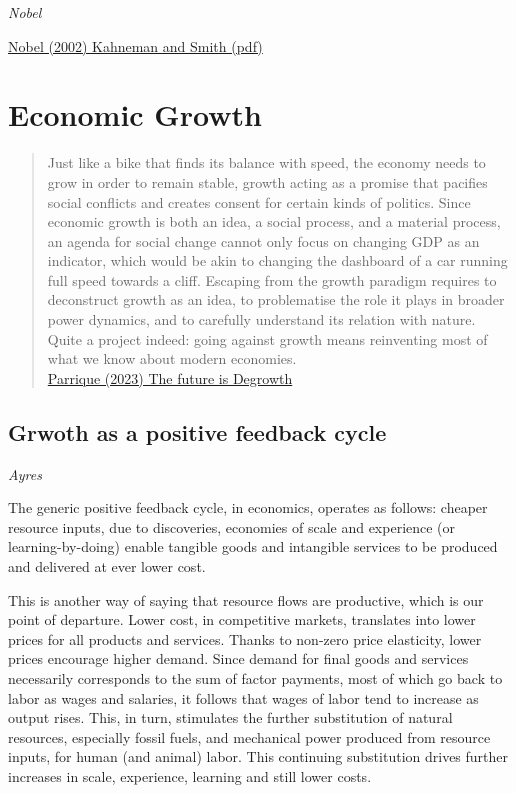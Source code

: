 \documentclass[
]{book}
\begin{document}
\emph{Nobel}

\href{pdf/Nobel_2002_Kahneman_and_Smith.pdf}{Nobel (2002) Kahneman and Smith (pdf)}

\hypertarget{economic-growth}{%
\chapter{Economic Growth}\label{economic-growth}}

\begin{quote}
Just like a bike that finds its balance with speed, the economy needs to grow in order to remain stable, growth acting as a promise that pacifies social conflicts and creates consent for certain kinds of politics.
Since economic growth is both an idea, a social process, and a material process, an agenda for social change cannot only focus on changing GDP as an indicator, which would be akin to changing the dashboard of a car running full speed towards a cliff. Escaping from the growth paradigm requires to deconstruct growth as an idea, to problematise the role it plays in broader power dynamics, and to carefully understand its relation with nature. Quite a project indeed: going against growth means reinventing most of what we know about modern economies.\\
\href{https://timotheeparrique.com/book-review-the-future-is-degrowth/}{Parrique (2023) The future is Degrowth}
\end{quote}

\hypertarget{grwoth-as-a-positive-feedback-cycle}{%
\section{Grwoth as a positive feedback cycle}\label{grwoth-as-a-positive-feedback-cycle}}

\emph{Ayres}

The generic positive feedback cycle, in economics, operates as follows:
cheaper resource inputs, due to discoveries, economies of scale and
experience (or learning-by-doing)
enable tangible goods and intangible services to be produced
and delivered at ever lower cost.

This is another way of saying that resource flows are productive,
which is our point of departure.
Lower cost, in competitive markets, translates into
lower prices for all products and services.
Thanks to non-zero price elasticity, lower prices encourage higher demand.
Since demand for final goods and services necessarily corresponds to
the sum of factor payments,
most of which go back to labor as wages and salaries,
it follows that
wages of labor tend to increase as output rises.
This, in turn, stimulates the further substitution
of natural resources, especially fossil fuels, and
mechanical power produced from resource inputs,
for human (and animal) labor.
This continuing substitution drives further increases in
scale, experience, learning and still lower costs.
\end{document}

